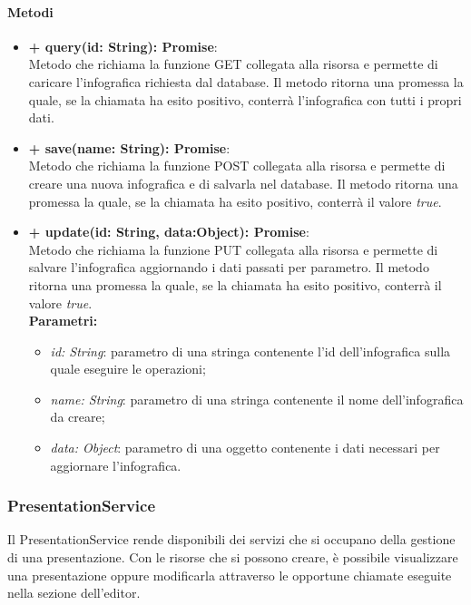 		\paragraph{Metodi}
		\begin{itemize}
			\item \textbf{+ query(id: String): Promise}:\\
				Metodo che richiama la funzione GET collegata alla risorsa e permette di caricare l'infografica richiesta dal database. Il metodo ritorna una promessa la quale, se la chiamata ha esito positivo, conterrà l'infografica con tutti i propri dati.\\
			\item \textbf{+ save(name: String): Promise}:\\
				Metodo che richiama la funzione POST collegata alla risorsa e permette di creare una nuova infografica e di salvarla nel database. Il metodo ritorna una promessa la quale, se la chiamata ha esito positivo, conterrà il valore \textit{true}.\\
			\item \textbf{+ update(id: String, data:Object): Promise}:\\
				Metodo che richiama la funzione PUT collegata alla risorsa e permette di salvare l'infografica aggiornando i dati passati per parametro. Il metodo ritorna una promessa la quale, se la chiamata ha esito positivo, conterrà il valore \textit{true}.\\
			\textbf{Parametri:}\\
			\begin{itemize}
				\item \textit{id: String}: parametro di una stringa contenente l'id dell'infografica sulla quale eseguire le operazioni;
				\item \textit{name: String}: parametro di una stringa contenente il nome dell'infografica da creare;
				\item \textit{data: Object}: parametro di una oggetto contenente i dati necessari per aggiornare l'infografica.
			\end{itemize}
		\end{itemize}


\subsubsection{PresentationService}
Il PresentationService rende disponibili dei servizi che si occupano della gestione di una presentazione. Con le risorse che si possono creare, è possibile visualizzare una presentazione oppure modificarla attraverso le opportune chiamate eseguite nella sezione dell'editor.


